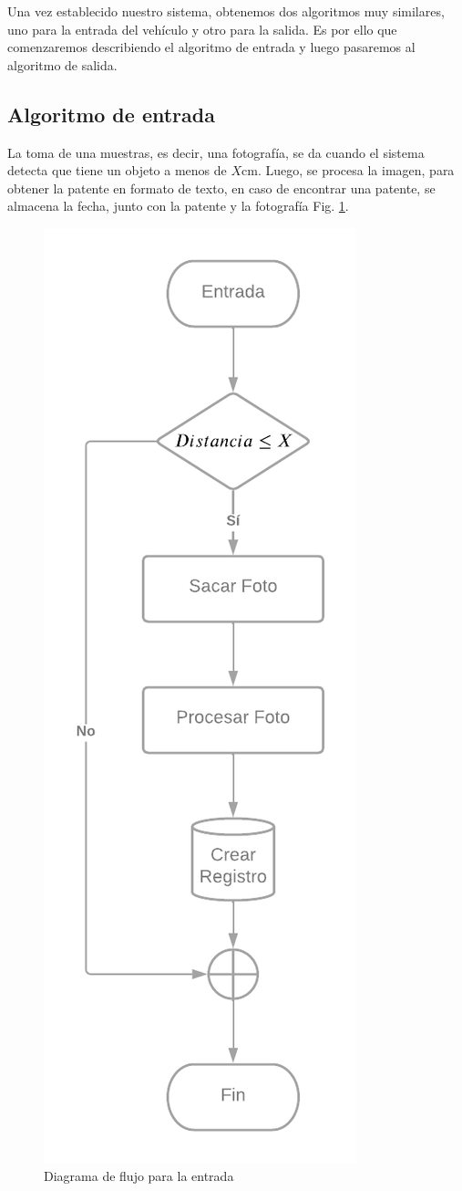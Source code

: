 Una vez establecido nuestro sistema, obtenemos dos algoritmos muy similares, uno para la entrada del vehículo y otro para la salida. Es por ello que comenzaremos describiendo el algoritmo de entrada y luego pasaremos al algoritmo de salida.

\subsection{Algoritmo de entrada}

La toma de una muestras, es decir, una fotografía, se da cuando el sistema detecta que tiene un objeto a menos de $X$cm. Luego, se procesa la imagen, para obtener la patente en formato de texto, en caso de encontrar una patente, se almacena la fecha, junto con la patente y la fotografía Fig. \ref{fig:flujo-entrada}.

\begin{figure}
    \centering
    \includegraphics[width=.5\textwidth]{imgs/flujo-entrada.png}
    \caption{Diagrama de flujo para la entrada}
    \label{fig:flujo-entrada}
\end{figure}

